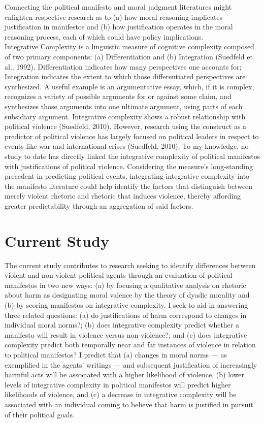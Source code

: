 \documentclass[
  english,
  man]{apa6}
\begin{document}
Connecting the political manifesto and moral judgment literatures might enlighten respective
research as to (a) how moral reasoning implicates justification in manifestos and (b) how
justification operates in the moral reasoning process, each of which could have policy
implications.\\
Integrative Complexity is a linguistic measure of cognitive complexity composed of two primary components: (a) Differentiation and (b) Integration (Suedfeld et al., 1992). Differentiation indicates how many perspectives one accounts for; Integration indicates the extent to which those differentiated perspectives are synthesized. A useful example is an argumentative essay, which, if it is complex, recognizes a variety of possible arguments for or against some claim, and synthesizes those arguments into one ultimate argument, using parts of each subsidiary argument. Integrative complexity shows a robust relationship with political violence (Suedfeld, 2010). However, research using the construct as a predictor of political violence has largely focused on political leaders in respect to events like war and international crises (Suedfeld, 2010). To my knowledge, no study to date has directly linked the integrative complexity of political manifestos with justifications of political violence. Considering the measure's long-standing precedent in predicting political events, integrating integrative complexity into the manifesto literature could help identify the factors that distinguish between merely violent rhetoric and rhetoric that induces violence, thereby affording greater predictability through an aggregation of said factors.

\section{Current Study}\label{current-study}

The current study contributes to research seeking to identify differences between violent and non-violent political agents through an evaluation of political manifestos in two new ways: (a) by focusing a qualitative analysis on rhetoric about harm as designating moral valence by the theory of dyadic morality and (b) by scoring manifestos on integrative complexity. I seek to aid in answering three related questions: (a) do justifications of harm correspond to changes in individual moral norms?; (b) does integrative complexity predict whether a manifesto will result in violence versus non-violence?; and (c) does integrative complexity predict both temporally near and far instances of violence in relation to political manifestos? I predict that (a) changes in moral norms --- as exemplified in the agents' writings --- and subsequent justification of increasingly harmful acts will be associated with a higher likelihood of violence, (b) lower levels of integrative complexity in political manifestos will predict higher likelihoods of violence, and (c) a decrease in integrative complexity will be associated with an individual coming to believe that harm is justified in pursuit of their political goals.
\end{document}
